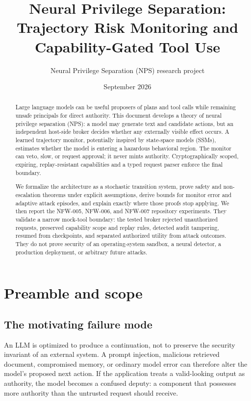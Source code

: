 \documentclass[11pt]{article}
\title{\textbf{Neural Privilege Separation:}\\
Trajectory Risk Monitoring and Capability-Gated Tool Use}
\author{Neural Privilege Separation (NPS) research project}
\date{September 2026}
\newcommand{\1}{\mathbf{1}}
\begin{document}
\maketitle

\begin{abstract}
Large language models can be useful proposers of plans and tool calls while remaining unsafe principals for direct authority. This document develops a theory of neural privilege separation (NPS): a model may generate text and candidate actions, but an independent host-side broker decides whether any externally visible effect occurs. A learned trajectory monitor, potentially inspired by state-space models (SSMs), estimates whether the model is entering a hazardous behavioral region. The monitor can veto, slow, or request approval; it never mints authority. Cryptographically scoped, expiring, replay-resistant capabilities and a typed request parser enforce the final boundary.

We formalize the architecture as a stochastic transition system, prove safety and non-escalation theorems under explicit assumptions, derive bounds for monitor error and adaptive attack episodes, and explain exactly where those proofs stop applying. We then report the NFW-005, NFW-006, and NFW-007 repository experiments. They validate a narrow mock-tool boundary: the tested broker rejected unauthorized requests, preserved capability scope and replay rules, detected audit tampering, resumed from checkpoints, and separated authorized utility from attack outcomes. They do not prove security of an operating-system sandbox, a neural detector, a production deployment, or arbitrary future attacks.
\end{abstract}

\tableofcontents

\section{Preamble and scope}

\subsection{The motivating failure mode}
An LLM is optimized to produce a continuation, not to preserve the security invariant of an external system. A prompt injection, malicious retrieved document, compromised memory, or ordinary model error can therefore alter the model's proposed next action. If the application treats a valid-looking output as authority, the model becomes a confused deputy: a component that possesses more authority than the untrusted request should receive.
\end{document}
